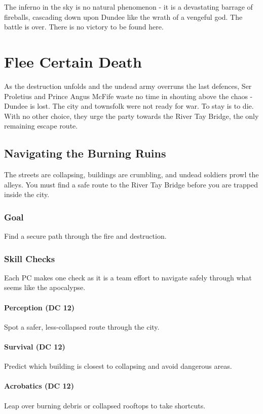 {\noindent\entryfont The inferno in the sky is no natural phenomenon - it is a devastating barrage of fireballs, cascading down upon Dundee like the wrath of a vengeful god. The battle is over. There is no victory to be found here.}

\section*{Flee Certain Death}
{\entryfont As the destruction unfolds and the undead army overruns the last defences, Ser Proletius and Prince Angus McFife waste no time in shouting above the chaos - Dundee is lost. The city and townsfolk were not ready for war. To stay is to die. With no other choice, they urge the party towards the River Tay Bridge, the only remaining escape route.}

\subsection*{Navigating the Burning Ruins}
\begin{DndReadAloud}
	The streets are collapsing, buildings are crumbling, and undead soldiers prowl the alleys. You must find a safe route to the River Tay Bridge before you are trapped inside the city.
\end{DndReadAloud}
\subsubsection*{Goal}
{\entryfont Find a secure path through the fire and destruction.}
\subsubsection*{Skill Checks}
{\entryfont Each PC makes one check as it is a team effort to navigate safely through what seems like the apocalypse.}
\paragraph*{Perception (DC 12)}
{\entryfont Spot a safer, less-collapsed route through the city.}
\paragraph*{Survival (DC 12)}
{\entryfont Predict which building is closest to collapsing and avoid dangerous areas.}
\paragraph*{Acrobatics (DC 12)}
{\entryfont Leap over burning debris or collapsed rooftops to take shortcuts.}
